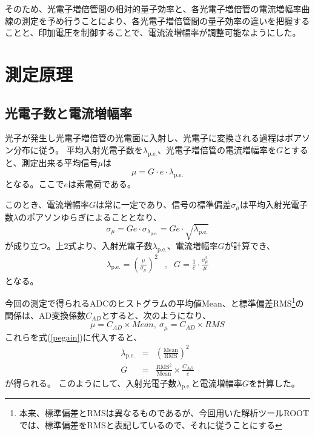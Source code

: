 \documentclass[11pt]{ltjsreport}
\newcommand{\equref}[1]{式(\ref{#1})}
\newcommand{\pe}{\mathrm{p.e.}}
\begin{document}
そのため、光電子増倍管間の相対的量子効率と、各光電子増倍管の電流増幅率曲線の測定を予め行うことにより、各光電子増倍管間の量子効率の違いを把握することと、印加電圧を制御することで、電流流増幅率が調整可能なようにした。



\section{測定原理}

\subsection{光電子数と電流増幅率}

光子が発生し光電子増倍管の光電面に入射し、光電子に変換される過程はポアソン分布に従う。
平均入射光電子数を$\lambda_{\pe}$、光電子増倍管の電流増幅率を$G$とすると、測定出来る平均信号$\mu$は
\begin{equation}
\mu = G\cdot e \cdot\lambda_{\pe}
\label{mu}
\end{equation}
となる。ここで$e$は素電荷である。

このとき、電流増幅率$G$は常に一定であり、信号の標準偏差$\sigma_{\mu}$は平均入射光電子数$\lambda$のポアソンゆらぎによることとなり、
\begin{equation}
\sigma_{\mu} = Ge\cdot \sigma_{\lambda_{\pe}}=Ge\cdot \sqrt{\lambda_{\pe}}
\label{sigmamu}
\end{equation}
が成り立つ。上2式より、入射光電子数$\lambda_{\pe}$、電流増幅率$G$が計算でき、
\begin{eqnarray}
\lambda_{\pe} = \left(\frac{\mu}{\sigma_{\mu}}\right)^{2}
&, & G  =  \frac{1}{e}\cdot \frac{\sigma_{\mu}^{2}}{\mu} \label{pegain}
\end{eqnarray}
となる。

今回の測定で得られるADCのヒストグラムの平均値Mean、と標準偏差RMS\footnote{本来、標準偏差とRMSは異なるものであるが、今回用いた解析ツールROOTでは、標準偏差をRMSと表記しているので、それに従うことにする}の関係は、AD変換係数$C_{AD}$とすると、次のようになり、
\begin{equation}
\mu = C_{AD} \times Mean,\  \sigma_{\mu} = C_{AD} \times RMS
\end{equation}
これらを\equref{pegain}に代入すると、
\begin{eqnarray}
\lambda_{\pe} & = & \left(\mathrm{\frac{Mean}{RMS}}\right)^{2}\\
G & = & \mathrm{\frac{RMS^{2}}{Mean}} \times \frac{C_{AD}}{e} \label{adcrms}
\end{eqnarray}
が得られる。
このようにして、入射光電子数$\lambda_{\pe}$と電流増幅率$G$を計算した。
\end{document}
